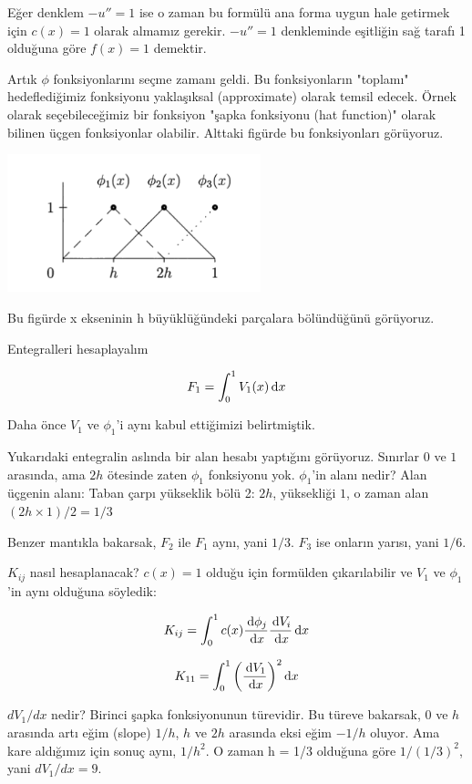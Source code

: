 \documentclass[12pt,fleqn]{article}\usepackage{../../common}
\begin{document}
Eğer denklem $-u''=1$ ise o zaman bu formülü ana forma uygun hale
getirmek için $c(x) = 1$ olarak almamız gerekir. $-u''=1$ denkleminde
eşitliğin sağ tarafı 1 olduğuna göre $f(x) = 1$ demektir.

Artık $\phi$ fonksiyonlarını seçme zamanı geldi. Bu fonksiyonların
"toplamı" hedeflediğimiz fonksiyonu yaklaşıksal (approximate) olarak
temsil edecek. Örnek olarak seçebileceğimiz bir fonksiyon "şapka
fonksiyonu (hat function)" olarak bilinen üçgen fonksiyonlar
olabilir. Alttaki figürde bu fonksiyonları görüyoruz.

\includegraphics[height=4cm]{fem_hat.png}

Bu figürde x ekseninin h büyüklüğündeki parçalara bölündüğünü görüyoruz. 

Entegralleri hesaplayalım

$$ F_1 = \int_0^1 V_1(x) \,\mathrm{d} x $$

Daha önce $V_1$ ve $\phi_1$'i aynı kabul ettiğimizi belirtmiştik. 

Yukarıdaki entegralin aslında bir alan hesabı yaptığını
görüyoruz. Sınırlar $0$ ve $1$ arasında, ama $2h$ ötesinde zaten
$\phi_1$ fonksiyonu yok. $\phi_1$'in alanı nedir? Alan üçgenin alanı:
Taban çarpı yükseklik bölü 2: $2h$, yüksekliği $1$, o zaman alan $(2h
\times 1) / 2 = 1/3$

Benzer mantıkla bakarsak, $F_2$ ile $F_1$ aynı, yani $1/3$. $F_3$ ise
onların yarısı, yani $1/6$.

$K_{ij}$ nasıl hesaplanacak? $c(x) = 1$ olduğu için formülden
çıkarılabilir ve $V_1$ ve $\phi_1$'in aynı olduğuna söyledik:

$$ K_{ij} = \int_0^1 c(x) \frac{\,\mathrm{d}\phi_j}{\,\mathrm{d} x} \frac{\,\mathrm{d} V_i}{\,\mathrm{d} x} \,\mathrm{d} x $$

$$ K_{11} = \int_0^1 \bigg( \frac{\,\mathrm{d} V_1}{\,\mathrm{d} x} \bigg) ^2 \,\mathrm{d} x  $$

$dV_1/dx$ nedir? Birinci şapka fonksiyonunun türevidir. Bu türeve
bakarsak, $0$ ve $h$ arasında artı eğim (slope) $1/h$, $h$ ve $2h$
arasında eksi eğim $-1/h$ oluyor. Ama kare aldığımız için sonuç aynı,
$1/h^2$. O zaman h = 1/3 olduğuna göre $1/(1/3)^2$, yani $dV_1/dx =
9$.
\end{document}
